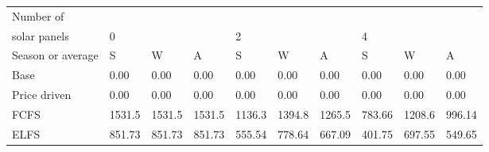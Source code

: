 \begin{table}[h] 
\centering 
\begin{tabular}{l|lll|lll|lll}Number of \\ solar panels&0& & &2& & &4& & \\ \hline 
Season or average & S & W & A & S & W & A & S & W & A \\ \hline 
Base&0.00&0.00&0.00&0.00&0.00&0.00&0.00&0.00&0.00 \\ 
Price driven&0.00&0.00&0.00&0.00&0.00&0.00&0.00&0.00&0.00 \\ 
FCFS&1531.5&1531.5&1531.5&1136.3&1394.8&1265.5&783.66&1208.6&996.14 \\ 
ELFS&851.73&851.73&851.73&555.54&778.64&667.09&401.75&697.55&549.65 \\ 
\end{tabular} 
\end{table}